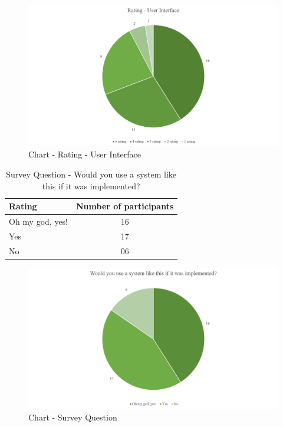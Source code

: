 \documentclass[12pt, oneside]{report}
\begin{document}
\begin {itemize}
\begin {figure} [h]
\centering
\includegraphics [scale=0.5] {ratingUserInterface}
\caption [Chart - Rating - User Interface] {Chart - Rating - User Interface}
\label {image-ratingUserInterface}
\end {figure}

\begin{table} [h]
\centering
\begin{tabular}{|l|c|}
\hline
Rating & Number of participants \\
\hline
Oh my god, yes!	&16 \\
Yes	&17 \\
No	&06 \\
\hline
\end{tabular}
\caption{Survey Question - Would you use a system like this if it was implemented?}
\label{table-survey-question-WouldYouUseASystemLikeThis}
\end{table}

\begin {figure} [h]
\centering
\includegraphics [scale=0.5] {questionWouldYouUse}
\caption [Chart - Survey Question] {Chart - Survey Question}
\label {image-questionWouldYouUse}
\end {figure}

\end {itemize}
\end{document}
